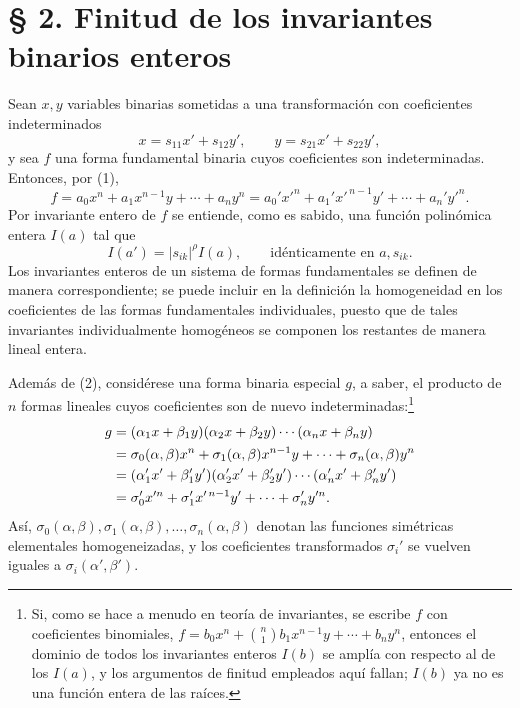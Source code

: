 \setcounter{equation}{0}
\section*{§ 2. Finitud de los invariantes binarios enteros}

Sean \(x,y\) variables binarias sometidas a una transformación con coeficientes indeterminados
\begin{equation}
        x=s_{11}x'+s_{12}y',\qquad y=s_{21}x'+s_{22}y',
\end{equation}
y sea \(f\) una forma fundamental binaria cuyos coeficientes son indeterminadas. Entonces, por (1),
\begin{equation}
        f=a_0x^n+a_1x^{n-1}y+\cdots+a_ny^n
        =a_0'x'^n+a_1'x'^{\,n-1}y'+\cdots+a_n'y'^n.
\end{equation}
Por invariante entero de \(f\) se entiende, como es sabido, una función polinómica entera \(I(a)\) tal que
\begin{equation}
        I(a')=|s_{ik}|^\rho I(a),\qquad \text{idénticamente en \(a,s_{ik}\)}.
\end{equation}
Los invariantes enteros de un sistema de formas fundamentales se definen de manera correspondiente; se puede incluir en la definición la homogeneidad en los coeficientes de las formas fundamentales individuales, puesto que de tales invariantes individualmente homogéneos se componen los restantes de manera lineal entera.

Además de (2), considérese una forma binaria especial \(g\), a saber, el producto de \(n\) formas lineales cuyos coeficientes son de nuevo indeterminadas:\footnote{Si, como se hace a menudo en teoría de invariantes, se escribe \(f\) con coeficientes binomiales, \(f=b_0x^n+\binom n1b_1x^{n-1}y+\cdots+b_ny^n\), entonces el dominio de todos los invariantes enteros \(I(b)\) se amplía con respecto al de los \(I(a)\), y los argumentos de finitud empleados aquí fallan; \(I(b)\) ya no es una función entera de las raíces.}
\begin{align}
        g&=(\alpha_1x+\beta_1y)(\alpha_2x+\beta_2y)\cdots(\alpha_nx+\beta_ny)\notag\\
         &=\sigma_0(\alpha,\beta)x^n+\sigma_1(\alpha,\beta)x^{n-1}y+\cdots+\sigma_n(\alpha,\beta)y^n\notag\\
         &=(\alpha_1'x'+\beta_1'y')(\alpha_2'x'+\beta_2'y')\cdots(\alpha_n'x'+\beta_n'y')\notag\\
         &=\sigma_0'x'^n+\sigma_1'x'^{\,n-1}y'+\cdots+\sigma_n'y'^n.
\end{align}
Así, \(\sigma_0(\alpha,\beta),\sigma_1(\alpha,\beta),\ldots,\sigma_n(\alpha,\beta)\) denotan las funciones simétricas elementales homogeneizadas, y los coeficientes transformados \(\sigma_i'\) se vuelven iguales a \(\sigma_i(\alpha',\beta')\).

